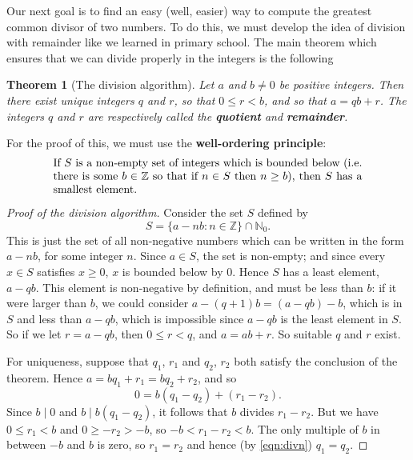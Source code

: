 \documentclass[a4paper,leqno]{article}
\numberwithin{equation}{section}
\newtheorem{thm}[equation]{Theorem}
\theoremstyle{definition}
\theoremstyle{remark}
\newcommand{\df}[1]{\textbf{#1}}
\begin{document}
Our next goal is to find an easy (well, easier) way to compute the greatest common divisor of two numbers. To do this, we must develop the
idea of division with remainder like we learned in primary school. The main theorem which ensures that we can divide properly in the integers
is the following
\begin{thm}[The division algorithm]
  Let $ a $ and $ b \neq 0 $ be positive integers. Then there exist \emph{unique} integers $ q $ and $ r $, so that $ 0 \leq r < b $,
  and so that $ a = qb + r $. The integers $ q $ and $ r $ are respectively called the \df{quotient} and \df{remainder}.
\end{thm}

For the proof of this, we must use the \df{well-ordering principle}:
\begin{equation}
  \begin{minipage}{0.8\textwidth}
    If $ S $ is a non-empty set of integers which is bounded below (i.e. there is some $ b \in \mathbb{Z} $ so that
    if $ n \in S $ then $ n \geq b $), then $ S $ has a smallest element.
  \end{minipage}
\end{equation}


\begin{proof}[Proof of the division algorithm]
  Consider the set $ S $ defined by
  \begin{equation}
    S = \{a - nb : n \in \mathbb{Z} \} \cap \mathbb{N}_0.
  \end{equation}
  This is just the set of all non-negative numbers which can be written in the form $ a - nb $, for some integer $ n $. Since $ a \in S $, the
  set is non-empty; and since every $ x \in S $ satisfies $ x \geq 0 $, $ x $ is bounded below by 0. Hence $ S $ has a least element, $ a - qb $.
  This element is non-negative by definition, and must be less than $ b $: if it were larger than $ b $, we could consider $ a - (q + 1)b = (a - qb) - b $,
  which is in $ S $ and less than $ a - qb $, which is impossible since $ a - qb $ is the least element in $ S $. So if we let $ r = a - qb $,
  then $ 0 \leq r < q $, and $ a = ab + r $. So suitable $ q $ and $ r $ exist.

  For uniqueness, suppose that $ q_1 $, $ r_1 $ and $ q_2 $, $ r_2 $ both satisfy the conclusion of the theorem. Hence $ a = bq_1 + r_1 = b q_2 + r_2 $,
  and so
  \begin{equation}\label{eqn:divn}
    0 = b(q_1 - q_2) + (r_1 - r_2).
  \end{equation}
  Since $ b \mid 0 $ and $ b \mid b(q_1 - q_2) $, it follows that $ b $ divides $ r_1 - r_2 $. But we have $ 0 \leq r_1 < b $ and $ 0 \geq -r_2 > -b $,
  so $ -b < r_1 - r_2 < b $. The only multiple of $ b $ in between $ -b $ and $ b $ is zero, so $ r_1 = r_2 $ and hence (by \ref{eqn:divn}) $ q_1 = q_2 $.
\end{proof}
\end{document}
